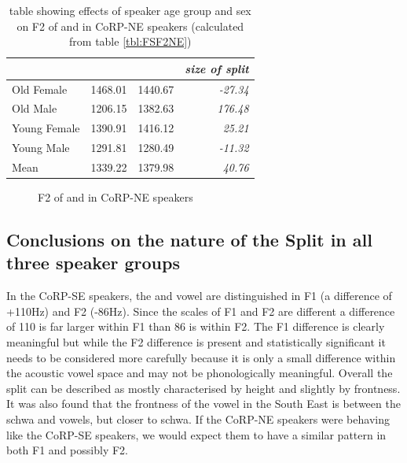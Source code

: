 \documentclass[../../../00.FullDoc/tex/ThesisSkeleton-draft2]{subfiles}
\begin{document}
\begin{table}[htbp]
	\centering
	\begin{tabular}{lrrr}
		\hline
		& \multicolumn{1}{l}{\foot{}} & \multicolumn{1}{l}{\strutt{}} & \multicolumn{1}{l}{\textit{size of split}} \\
		\hline
		Old Female & 1468.01 & 1440.67 & \textit{-27.34} \\
		Old Male & 1206.15 & 1382.63 & \textit{176.48} \\
		Young Female & 1390.91 & 1416.12 & \textit{25.21} \\
		Young Male & 1291.81 & 1280.49 & \textit{-11.32} \\
		Mean  & 1339.22 & 1379.98 & \textit{40.76} \\
		\hline
	\end{tabular}%
	\caption{table showing effects of speaker age group and sex on F2 of \foot{} and \strutt{} in CoRP-NE speakers (calculated from table \ref{tbl:FSF2NE})}
	\label{tbl:FSF2NEinter}
	\end{table}%

\begin{figure}[h]
	
	\caption{F2 of \foot{} and \strutt{} in CoRP-NE speakers} \label{fig:FSF2NE}
\end{figure}


\subsection{Conclusions on the nature of the \FS{} Split in all three speaker groups}
In the CoRP-SE speakers, the \foot{} and \strutt{} vowel are distinguished in F1 (a difference of +110Hz) and F2 (-86Hz). Since the scales of F1 and F2 are different a difference of 110 is far larger within F1 than 86 is within F2. The F1 difference is clearly meaningful but while the F2 difference is present and statistically significant it needs to be considered more carefully because it is only a small difference within the acoustic vowel space and may not be phonologically meaningful. Overall the \FS split can be described as mostly characterised by height and slightly by frontness. It was also found that the frontness of the \strutt{} vowel in the South East is between the schwa and  vowels, but closer to schwa. If the CoRP-NE speakers were behaving like the CoRP-SE speakers, we would expect them to have a similar pattern in both F1 and possibly F2.
\end{document}
